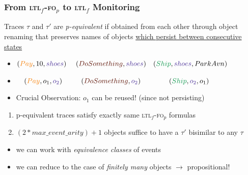 \documentclass[xcolor=dvipsnames,aspectratio=169]{beamer}
\newcommand{\ltlf}{\textsc{ltl}$_f$\xspace}
\newcommand{\ltlffop}{\ltlf-\textsc{fo}$_p$\xspace}
\newcommand{\green}[1]{\textcolor{ForestGreen}{#1}}
\newcommand{\orange}[1]{\textcolor{BurntOrange}{#1}}
\newcommand{\violet}[1]{\textcolor{Violet}{#1}}
\newcommand{\sepia}[1]{\textcolor{Sepia}{#1}}
\begin{document}
\begin{frame}
\frametitle{From \ltlffop to \ltlf Monitoring}

\begin{definition}[p-equivalence]
Traces $\tau$ and $\tau'$ are \emph{p-equivalent} if obtained from each other through object renaming 
that preserves names of objects \ul{which persist between consecutive states}
\end{definition}

\begin{itemize}
	\item $(\orange{Pay},10,\violet{shoes})~~~~(\sepia{DoSomething},\violet{shoes})~~~(\green{Ship},\violet{shoes},Park Avn)$
	\item $~~~(\orange{Pay},o_1,\violet{o_2})~~~~~~~~(\sepia{DoSomething},\violet{o_2})~~~~~~~~~~~~(\green{Ship},\violet{o_2},o_1)$
	\item Crucial Observation: $o_1$ can be reused! (since not persisting)
\end{itemize}


\begin{theorem}
	\begin{enumerate}
		\item p-equivalent traces satisfy exactly same \ltlffop formulas
		\item $(2*max\_event\_arity)+1$ objects suffice to have a $\tau'$
			bisimilar to any $\tau$
	\end{enumerate}
\end{theorem}


\begin{itemize}
	\item we can work with \emph{equivalence classes} of events
	\item we can reduce to the case of \emph{finitely many} objects $\rightarrow$ propositional!
\end{itemize}
\end{frame}

\end{document}
